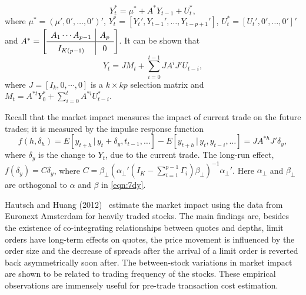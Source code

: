 	\begin{equation}\label{eqn:starlargeyt}
	Y_t^*= \mu^* + A^* Y_{t-1} + U_t^*,
	\end{equation}
where $\mu^*=(\mu',0',\ldots,0')'$, $Y_t^*=[Y_t',Y_{t-1}',\ldots,Y_{t-p+1}']$, $U_t^*=[U_t',0',\ldots,0']'$ and $A^*=\renewcommand\arraystretch{1.3} \mleft[ \begin{array}{c|c} A_1\cdots A_{p-1} & A_p \\ \hline I_{K(p-1)} & 0 \end{array} \mright]$. It can be shown that 
	\begin{equation}\label{eqn:7anotherlargeyt}
	Y_t= JM_t + \sum_{i=0}^{t-1} JA^i J' U_{t-i},
	\end{equation}
where $J=[I_k,0,\cdots,0]$ is a $k\times kp$ selection matrix and $M_t= A^{*t} Y_0^* + \sum_{i=0}^t A^{*i}U_{t-i}^*$.


Recall that the market impact measures the impact of current trade on the future trades; it is measured by the impulse response function
	\begin{equation} \label{eqn:impulserep}
	f(h,\delta_h) = E[y_{t+h} \,|\, y_t+\delta_y,t_{t-1}, \ldots] - E[y_{t+h} \,|\, y_t,y_{t-i}, \ldots] = JA^{*h} J' \delta_y,
	\end{equation}
where $\delta_y$ is the change to $Y_t$, due to the current trade. The long-run effect, $f(\delta_y)= C \delta_y$, where $C= \beta_\perp(\alpha_\perp' (I_K - \sum_{i=1}^{p-1} \Gamma_i ) \beta_\perp )^{-1} \alpha_\perp'$. Here $\alpha_\perp$ and $\beta_\perp$ are orthogonal to $\alpha$ and $\beta$ in \eqref{eqn:7dy}.


Hautsch and Huang (2012)~\cite{hauthuang} estimate the market impact using the data from Euronext Amsterdam for heavily traded stocks. The main findings are, besides the existence of co-integrating relationships between quotes and depths, limit orders have long-term effects on quotes, the price movement is influenced by the order size and the decrease of spreads after the arrival of a limit order is reverted back asymmetrically soon after. The between-stock variations in market impact are shown to be related to trading frequency of the stocks. These empirical observations are immensely useful for pre-trade transaction cost estimation.


